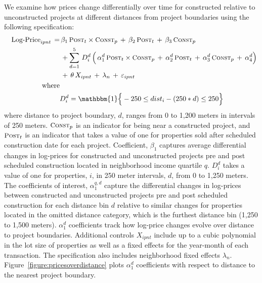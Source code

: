 \documentclass[12pt]{article}
\begin{document}
We examine how prices change differentially over time for constructed relative to unconstructed projects at different distances from project boundaries using the following specification:
\begin{align*}
\quad \text{Log-Price}_{ipnt} \, =&  \, \beta_1 \, \textsc{\small Post}_{t}\times\textsc{\small Const}_{p} \, + \, \beta_2 \, \textsc{\small Post}_{t} \, + \, \beta_3 \, \textsc{\small Const}_{p}\,  \\
 &\, + \sum_{d=1}^5 \,D_i^{d} \, \Big( \, \alpha_1^{d} \, \textsc{\small Post}_{t}\times\textsc{\small Const}_{p} \, + \, \alpha_2^{d} \, \textsc{\small Post}_{t} \, + \, \alpha_3^{d} \, \textsc{\small Const}_{p}\, +\, \alpha_4^{d} \Big) \, \\
&\, + \, \theta \, X_{ipnt} \, + \, \lambda_n \, + \, \varepsilon_{ipnt} \quad  \\
\text{where}& \\
& D_i^{d} = \mathbbm{1} \Big\{  - 250 \leq dist_i -(250*d) \leq  250 \Big\}
\end{align*}
\noindent where distance to project boundary, $d$, ranges from 0 to 1,200 meters in intervals of 250 meters.  $\textsc{\small Const}_{p}$ is an indicator for being near a constructed project, and  $\textsc{\small Post}_{t}$ is an indicator that takes a value of one for properties sold after scheduled construction date for each project.  Coefficient, $\beta_1$ captures average differential changes in log-prices for constructed and unconstructed projects pre and post scheduled construction located in neighborhood income quartile $q$.  $D_i^{d}$ takes a value of one for properties, $i$, in 250 meter intervals, $d$, from 0 to 1,250 meters.  The coefficients of interest, $\alpha_1^{q,d}$ capture the differential changes in log-prices between constructed and unconstructed projects pre and post scheduled construction for each distance bin $d$ relative to similar changes for properties located in the omitted distance category, which is the furthest distance bin (1,250 to 1,500 meters).  $\alpha_1^{d}$ coefficients track how log-price changes evolve over distance to project boundaries.  Additional controls $X_{ipnt}$ include up to a cubic polynomial in the lot size of properties as well as a fixed effects for the year-month of each transaction.  The specification also includes neighborhood fixed effects $\lambda_n$.  Figure~\ref{figure:pricesoverdistance} plots $\alpha_1^{d}$ coefficients with respect to distance to the nearest project boundary.  
\end{document}
